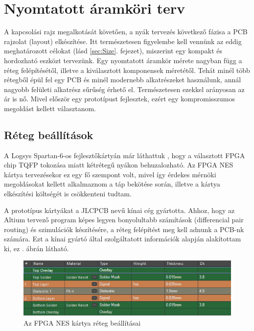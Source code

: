 \section{Nyomtatott áramköri terv}

A kapcsolási rajz megalkotását követően, a nyák tervezés következő fázisa a PCB rajzolat (layout) elkészítése. Itt természetesen figyelembe kell vennünk az eddig meghatározott célokat (lásd \ref{sec:Size}. fejezet), miszerint egy kompakt és hordozható eszközt tervezünk. Egy nyomtatott áramkör mérete nagyban függ a réteg felépítésétől, illetve a kiválasztott komponensek méretétől. Tehát minél több rétegből épül fel egy PCB és minél modernebb alkatrészeket használunk, annál nagyobb felületi alkatrész sűrűség érhető el. Természetesen ezekkel arányosan az ár is nő. Mivel először egy prototípust fejlesztek, ezért egy kompromisszumos megoldást kellett választanom.   
		
	\subsection{Réteg beállítások}
	
	A Logsys Spartan-6-os fejlesztőkártyán már láthattuk \cite{spatan6}, hogy a választott FPGA chip TQFP tokozása miatt kétrétegű nyákon behuzalozható. Az FPGA NES kártya tervezésekor ez egy fő szempont volt, mivel így érdekes mérnöki megoldásokat kellett alkalmaznom a táp bekötése során, illetve a kártya elkészítési költségét is csökkenteni tudtam.
	
	A prototípus kártyákat a JLCPCB nevű kínai cég gyártotta. Ahhoz, hogy az Altium tervező program képes legyen bonyolultabb számítások (differencial pair routing) és szimulációk készítésére, a réteg felépítést meg kell adnunk a PCB-nk számára. Ezt a kínai gyártó által szolgáltatott információk alapján \cite{jlcpcb} alakítottam ki, ez . ábrán látható.    
	
	\begin{figure}[H]
		\centering
		\includegraphics[width=150mm, keepaspectratio]{figures/Layer-stackup}
		\caption{Az FPGA NES kártya réteg beállításai}
		\label{fig:Layer-stackup}
	\end{figure}
	
